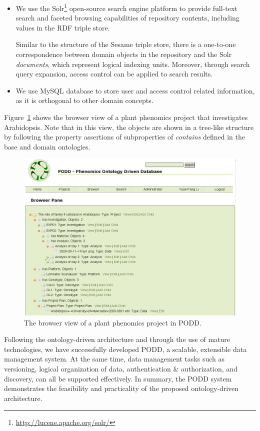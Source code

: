 \documentclass{elsarticle}
\begin{document}
\begin{itemize}
\item We use the Solr\footnote{\url{http://lucene.apache.org/solr/}}
open-source search engine platform to provide full-text search
and faceted browsing capabilities of repository
contents, including values in the RDF triple store.

Similar to the structure of the Sesame triple store,
there is a one-to-one correspondence between domain objects
in the repository and the Solr \emph{documents}, which
represent logical indexing units. Moreover, through
search query expansion, access control can be applied to
search results.

\item We use MySQL database to store user and access control
related information, as it is orthogonal to other domain
concepts.

\end{itemize}

Figure~\ref{fig:browser} shows the browser view of a plant phenomics
project that investigates Arabidopsis. Note that in this view, the
objects are shown in a tree-like structure by following the property
assertions of subproperties of \emph{contains} defined in the base
and domain ontologies.

\begin{figure}[htb]
\centering
\includegraphics[trim = 0mm 2mm 5mm 0mm, clip,width=120mm]{browser.png}
\vspace{-4pt} \caption{The browser view of a plant phenomics project
in PODD.}\label{fig:browser}
\end{figure}

Following the ontology-driven architecture and through the use
of mature technologies, we have successfully developed PODD, a
scalable, extensible data management system. At the same time,
data management tasks such as versioning, logical organization
of data, authentication \& authorization, and discovery, can
all be supported effectively. In summary, the PODD system
demonstrates the feasibility and practicality of the proposed
ontology-driven architecture.
\end{document}
